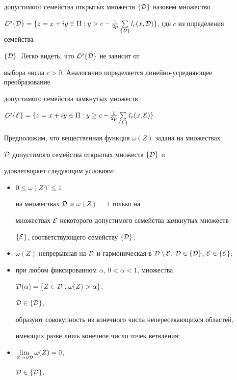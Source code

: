 допустимого семейства открытых множеств $\{{\cal D}\}$ назовем множество


${\cal L}^p \{{\cal D}\}=\{z=x+iy\in\Pi: y>c-\frac{1}{2p}\sum\limits_{\{\cal


D\}}l_c(x,{\cal D})\}$, где $c$ из определения семейства


$\{{\cal D}\}$. Легко видеть, что ${\cal L}^p\{{\cal D}\}$ не зависит от


выбора числа $c>0$. Аналогично определяется линейно-усредняющее преобразование


допустимого семейства замкнутых множеств


${\cal L}^p\{{\cal E}\}=


\{z=x+iy\in\Pi: y\geq c-\frac{1}{2p}\sum\limits_{\{\cal


E\}}l_c(x,{\cal E})\}$.





Предположим, что вещественная функция $\omega(Z)$ задана на множествах


${\cal D}$ допустимого семейства открытых множеств $\{{\cal D}\}$ и


удовлетворяет следующим условиям:


\begin{itemize}


\item[1)] $0\le \omega (Z)\leq 1$


на множествах ${\cal D}$ и $\omega (Z)=1$ только на


множествах ${\cal E}$ некоторого допустимого семейства замкнутых множеств


$\{{\cal E}\}$, соответствующего семейству $\{{\cal D}\}$;


\item[2)] $\omega (Z)$ непрерывная на ${\cal D}$ и гармоническая в $\cal


D\setminus{\cal E}$, ${\cal D}\in \{{\cal D}\}$, ${\cal E}\in\{{\cal E}\}$;


\item[3)] при любом фиксированном $\alpha$, $ 0<\alpha<1$, множества


${\cal D}(\alpha)=\{Z\in{\cal D}: \omega(Z)>\alpha\}$,


${\cal D}\in\{{\cal D}\}$,


образуют совокупность из конечного числа непересекающихся областей,


имеющих разве лишь конечное число точек ветвления;


\item[4)] $\lim\limits_{Z\to\partial{\cal D}}\omega(Z)=0$,


${\cal D}\in\{{\cal D}\}$.


\end{itemize}


